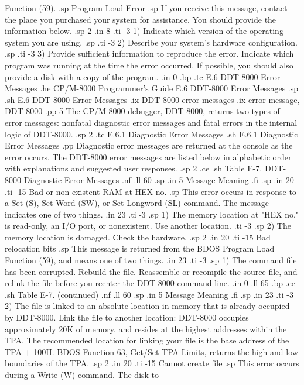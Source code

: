 Function (59).
.sp
Program Load Error
.sp
If you receive this message, contact the place you purchased your 
system for assistance.  
You should provide the information below.
.sp 2
.in 8
.ti -3
1) Indicate which version of the operating system you are using.
.sp
.ti -3
2) Describe your system's hardware configuration.
.sp
.ti -3
3) Provide sufficient information to reproduce the error.  Indicate 
which program was running at the time the error occurred.  If possible, 
you should also provide a disk with a copy of the program.
.in 0
.bp
.tc    E.6  DDT-8000 Error Messages
.he CP/M-8000 Programmer's Guide           E.6  DDT-8000 Error Messages
.sp
.sh
E.6  DDT-8000 Error Messages
.ix DDT-8000 error messages
.ix error message, DDT-8000
.pp 5
The CP/M-8000 debugger, DDT-8000, returns two types of error messages:  
nonfatal diagnostic error messages and fatal errors in the internal logic
of DDT-8000.
.sp 2
.tc         E.6.1  Diagnostic Error Messages
.sh
E.6.1  Diagnostic Error Messages 
.pp
Diagnostic error messages are returned at the console as the error occurs.  
The DDT-8000 error messages are listed below in alphabetic order
with explanations and suggested user responses.
.sp 2
.ce
.sh
Table E-7.  DDT-8000 Diagnostic Error Messages
.nf
.ll 60
.sp
.in 5
Message        Meaning
.fi
.sp
.in 20
.ti -15
Bad or non-existent RAM at HEX no.
.sp
This error occurs in response to a Set (S), Set Word (SW), 
or Set Longword (SL) command.  The message indicates one of two 
things.  
.in 23
.ti -3
.sp
1) The memory location at "HEX no." is  read-only, an I/O port, 
or nonexistent.  Use another location.
.ti -3
.sp
2) The memory location is damaged.  Check the hardware.
.sp 2
.in 20
.ti -15
Bad relocation bits
.sp
This message is returned from the BDOS Program Load Function
(59), and means one of two things.  
.in 23
.ti -3
.sp 
1) The command file has been corrupted.  Rebuild the file.  Reassemble or 
recompile the source file, and relink the file before you reenter the 
DDT-8000 command line.
.in 0
.ll 65
.bp
.ce
.sh
Table E-7.  (continued)
.nf
.ll 60
.sp
.in 5
Message        Meaning
.fi
.sp
.in 23
.ti -3
2) The file is linked to an absolute location in memory that is already 
occupied by DDT-8000.  Link the file to another location:  DDT-8000 occupies 
approximately 20K
of memory, and resides at the highest addresses within the TPA.  The 
recommended location for linking your file is the base address of
the TPA + 100H.  BDOS Function 63, Get/Set TPA Limits, returns 
the high and low boundaries of the TPA.
.sp 2
.in 20
.ti -15
Cannot create file
.sp
This error occurs during a Write (W) command.  The disk to 
